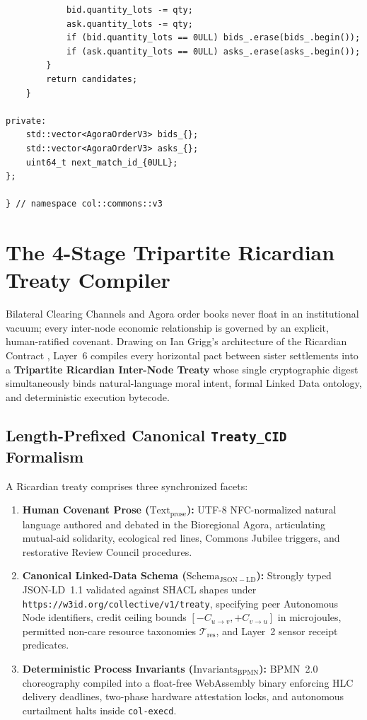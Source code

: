 \begin{lstlisting}
            bid.quantity_lots -= qty;
            ask.quantity_lots -= qty;
            if (bid.quantity_lots == 0ULL) bids_.erase(bids_.begin());
            if (ask.quantity_lots == 0ULL) asks_.erase(asks_.begin());
        }
        return candidates;
    }

private:
    std::vector<AgoraOrderV3> bids_{};
    std::vector<AgoraOrderV3> asks_{};
    uint64_t next_match_id_{0ULL};
};

} // namespace col::commons::v3
\end{lstlisting}

\section{The 4-Stage Tripartite Ricardian Treaty Compiler}
\label{sec:ricardian-treaty-compiler}

Bilateral Clearing Channels and Agora order books never float in an institutional vacuum; every inter-node economic relationship is governed by an explicit, human-ratified covenant. Drawing on Ian Grigg's architecture of the Ricardian Contract \parencite{grigg2004}, Layer~6 compiles every horizontal pact between sister settlements into a \textbf{Tripartite Ricardian Inter-Node Treaty} whose single cryptographic digest simultaneously binds natural-language moral intent, formal Linked Data ontology, and deterministic execution bytecode.

\subsection{Length-Prefixed Canonical \texttt{Treaty\_CID} Formalism}

A Ricardian treaty comprises three synchronized facets:
\begin{enumerate}
  \item \textbf{Human Covenant Prose ($\mathrm{Text}_{\mathrm{prose}}$):} UTF-8 NFC-normalized natural language authored and debated in the Bioregional Agora, articulating mutual-aid solidarity, ecological red lines, Commons Jubilee triggers, and restorative Review Council procedures.
  \item \textbf{Canonical Linked-Data Schema ($\mathrm{Schema}_{\mathrm{JSON-LD}}$):} Strongly typed JSON-LD~1.1 \parencite{w3c2020jsonld} validated against SHACL shapes \parencite{w3c2017shacl} under \texttt{https://w3id.org/collective/v1/treaty}, specifying peer Autonomous Node identifiers, credit ceiling bounds $[-C_{u \to v}, +C_{v \to u}]$ in microjoules, permitted non-care resource taxonomies $\mathcal{T}_{\mathrm{res}}$, and Layer~2 sensor receipt predicates.
  \item \textbf{Deterministic Process Invariants ($\mathrm{Invariants}_{\mathrm{BPMN}}$):} BPMN~2.0 choreography \parencite{omg2011bpmn} compiled into a float-free WebAssembly binary \parencite{haas2017wasm} enforcing HLC delivery deadlines, two-phase hardware attestation locks, and autonomous curtailment halts inside \texttt{col-execd}.
\end{enumerate}

